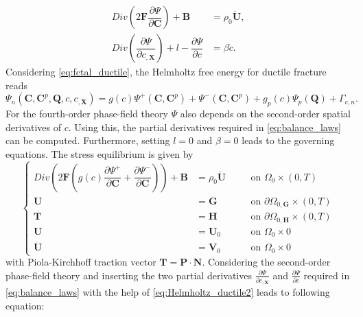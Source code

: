 \begin{equation} \label{eq:balance_laws}
	\begin{aligned}
		Div\left(2\mathbf{F}\dfrac{\partial\Psi}{\partial\mathbf{C}}\right)+\mathbf{B} &= \rho_{0}\ddot{\mathbf{U}}, \\
		Div\left(\dfrac{\partial\Psi}{\partial c_{,\mathbf{X}}}\right)+l-\dfrac{\partial\Psi}{\partial c} &= \beta\dot{c}.
	\end{aligned}
\end{equation}
Considering \eqref{eq:fctal_ductile}, the Helmholtz free energy for ductile fracture reads
\begin{equation} \label{eq:Helmholtz_ductile2}
	\Psi_{n}\left(\mathbf{C},\mathbf{C}^{p},\mathbf{Q},c,c_{,\mathbf{X}}\right) = g\left(c\right)\Psi^{+}\left(\mathbf{C},\mathbf{C}^{p}\right)+\Psi^{-}\left(\mathbf{C},\mathbf{C}^{p}\right)+g_{p}\left(c\right)\Psi_{p}\left(\mathbf{Q}\right)+\Gamma_{c,n}.
\end{equation}
For the fourth-order phase-field theory $\Psi$ also depends on the second-order spatial derivatives of $c$. Using this, the partial derivatives required in \eqref{eq:balance_laws} can be computed. Furthermore, setting $l=0$ and $\beta=0$ leads to the governing equations. The stress equilibrium is given by
\begin{equation} \label{eq:stress_equil_ductile}
	 \left\{\begin{alignedat}{2}
		Div\left(2\mathbf{F}\left(g\left(c\right)\dfrac{\partial\Psi^{+}}{\partial\mathbf{C}}+\dfrac{\partial\Psi^{-}}{\partial\mathbf{C}}\right)\right)+\mathbf{B} &= \rho_{0}\ddot{\mathbf{U}} && \quad\text{on } \Omega_{0}\times\left(0,T\right) \\
		\mathbf{U} &= \mathbf{G} && \quad\text{on } \partial\Omega_{0,\mathbf{G}}\times\left(0,T\right) \\
		\mathbf{T} &= \mathbf{H} && \quad\text{on } \partial\Omega_{0,\mathbf{H}}\times\left(0,T\right) \\
		\mathbf{U} &= \mathbf{U}_{0} && \quad\text{on } \Omega_{0}\times0 \\
		\dot{\mathbf{U}} &= \mathbf{V}_{0} && \quad\text{on } \Omega_{0}\times0
  \end{alignedat}\right.
\end{equation}
with Piola-Kirchhoff traction vector $\mathbf{T}=\mathbf{P}\cdot\mathbf{N}$. Considering the second-order phase-field theory and inserting the two partial derivatives $\frac{\partial\Psi}{\partial c_{,\mathbf{X}}}$ and $\frac{\partial\Psi}{\partial c}$ required in \eqref{eq:balance_laws} with the help of \eqref{eq:Helmholtz_ductile2} leads to following equation:
